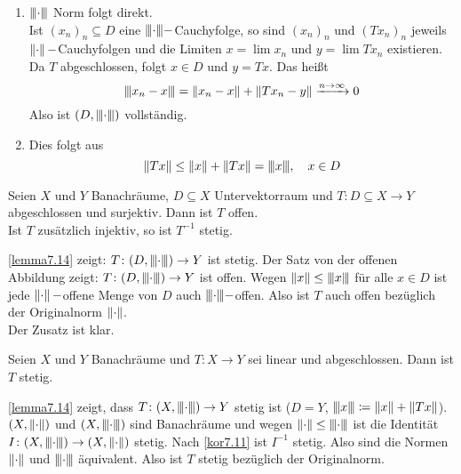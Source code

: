 \begin{beweis}
	\begin{enumerate}
		\item $ \vertiii{\cdot} $ Norm folgt direkt.\\
		Ist $ (x_n)_n\subseteq D $ eine $ \vertiii{\cdot}- $Cauchyfolge, so sind $ (x_n)_n $ und $ (Tx_n)_n $ jeweils $ \norm{\cdot}- $Cauchyfolgen und die Limiten $ x=\lim x_n $ und $ y=\lim Tx_n $ existieren. Da $ T $ abgeschlossen, folgt $ x\in D $ und $ y=Tx $. Das hei\ss t
		\[ \vertiii{x_n-x}=\norm{x_n-x}+\norm{Tx_n-y}\xrightarrow{n\to\infty}0 \]
		Also ist $ (D,\vertiii{\cdot}) $ vollst\"andig.
		\item Dies folgt aus
		\[ \norm{Tx}\leq\norm{x}+\norm{Tx}=\vertiii{x},\quad x\in D \]
	\end{enumerate}\vspace{-22pt}
\end{beweis}
\newpage
\begin{satz}
	Seien $ X $ und $ Y $ Banachr\"aume, $ D\subseteq X $ Untervektorraum und $ T\colon D\subseteq X\rightarrow Y $ abgeschlossen und surjektiv. Dann ist $ T $ offen.\\
	Ist $ T $ zus\"atzlich injektiv, so ist $ T^{-1}  $ stetig.
\end{satz}
\begin{beweis}
	\ref{lemma7.14} zeigt: $ T\colon(D,\vertiii{\cdot})\rightarrow Y $ ist stetig. Der Satz von der offenen Abbildung zeigt: $ T\colon (D,\vertiii{\cdot})\rightarrow Y $ ist offen. Wegen $ \norm{x}\leq\vertiii{x} $ f\"ur alle $ x\in D $ ist jede $ \norm{\cdot}- $offene Menge von $ D $ auch $ \vertiii{\cdot}- $offen. Also ist $ T $ auch offen bez\"uglich der Originalnorm $ \norm{\cdot} $.\\
	Der Zusatz ist klar.
\end{beweis}
\begin{theorem}
	Seien $ X $ und $ Y $ Banachr\"aume und $ T\colon X\rightarrow Y $ sei linear und abgeschlossen. Dann ist $ T $ stetig.
\end{theorem}
\begin{beweis}
	\ref{lemma7.14} zeigt, dass $ T\colon(X,\vertiii{\cdot})\rightarrow Y $ stetig ist ($ D=Y $, $ \vertiii{x}\coloneqq\norm{x}+\norm{Tx} $). $ (X,\norm{\cdot}) $ und $ (X,\vertiii{\cdot}) $ sind Banachr\"aume und wegen $ \norm{\cdot}\leq\vertiii{\cdot} $ ist die Identit\"at $ I\colon(X,\vertiii{\cdot})\rightarrow(X,\norm{\cdot}) $ stetig. Nach \ref{kor7.11} ist $ I^{-1} $ stetig. Also sind die Normen $ \norm{\cdot} $ und $ \vertiii{\cdot} $ \"aquivalent. Also ist $ T $ stetig bez\"uglich der Originalnorm.
\end{beweis}